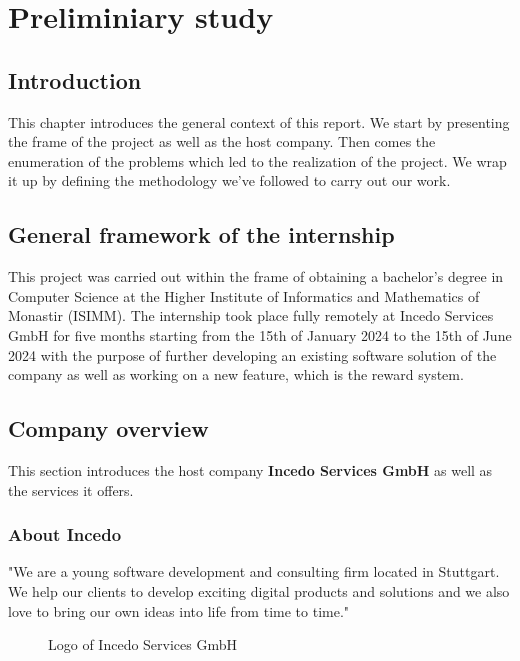 \chapter{Preliminiary study}


\setcounter{secnumdepth}{0} %
\section{Introduction}
This chapter introduces the general context of this report.
We start by presenting the frame of the project as well as the host company.
Then comes the enumeration of the problems which led to the realization of the project.
We wrap it up by defining the methodology we’ve followed to carry out our work.

\setcounter{secnumdepth}{2} %
\section{General framework of the internship}
This project was carried out within the frame of obtaining a bachelor’s degree in Computer Science at the Higher Institute of Informatics and Mathematics of Monastir (ISIMM).
The internship took place fully remotely at Incedo Services GmbH for five months starting from the 15th of January 2024 to the 15th of June 2024 with the purpose of further developing an existing software solution of the company as well as working on a new feature, which is the reward system.

\section{Company overview}
This section introduces the host company {\bf Incedo Services GmbH} as well as the services it offers.
\subsection{About Incedo}
"We are a young software development and consulting firm located in Stuttgart.
We help our clients to develop exciting digital products and solutions and we also love to bring our own ideas into life from time to time." \cite{about-incedo}
\begin{figure}[H]
    \centering
    \caption{Logo of Incedo Services GmbH}
    \label{fig:logo-of-incedo}
\end{figure}

